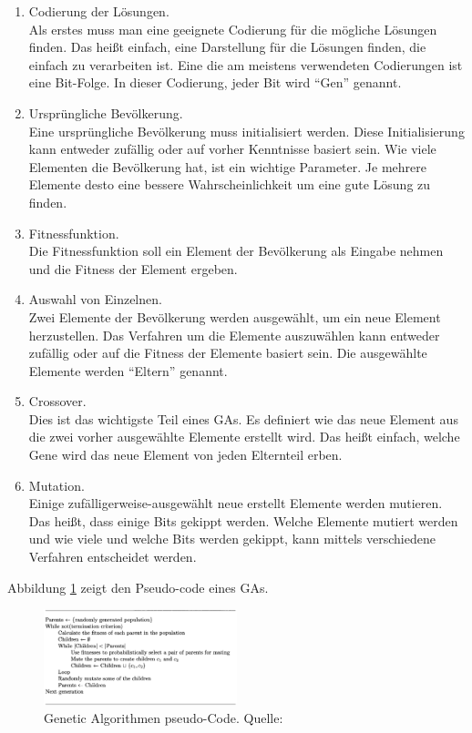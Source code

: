 \documentclass[twoside,twocolumn]{article}
\begin{document}
\begin{enumerate}
\item{Codierung der Lösungen.}\\
Als erstes muss man eine geeignete Codierung für die mögliche Lösungen finden. Das heißt einfach, eine Darstellung für die Lösungen finden, die einfach zu verarbeiten ist. Eine die am meistens verwendeten Codierungen ist eine Bit-Folge. In dieser Codierung, jeder Bit wird ``Gen'' genannt.
\item{Ursprüngliche Bevölkerung.}\\
Eine ursprüngliche Bevölkerung muss initialisiert werden. Diese Initialisierung kann entweder zufällig oder auf vorher Kenntnisse basiert sein. Wie viele Elementen die Bevölkerung hat, ist ein wichtige Parameter. Je mehrere Elemente desto eine bessere Wahrscheinlichkeit um eine gute Lösung zu finden.
\item{Fitnessfunktion.}\\
Die Fitnessfunktion soll ein Element der Bevölkerung als Eingabe nehmen und die Fitness der Element ergeben.
\item{Auswahl von Einzelnen.}\\
Zwei Elemente der Bevölkerung werden ausgewählt, um ein neue Element herzustellen. Das Verfahren um die Elemente auszuwählen kann entweder zufällig oder auf die Fitness der Elemente basiert sein. Die ausgewählte Elemente werden ``Eltern'' genannt.
\item{Crossover.}\\
Dies ist das wichtigste Teil eines GAs. Es definiert wie das neue Element aus die zwei vorher ausgewählte Elemente erstellt wird. Das heißt einfach, welche Gene wird das neue Element von jeden Elternteil erben.
\item{Mutation.}\\
Einige zufälligerweise-ausgewählt neue erstellt Elemente werden mutieren. Das heißt, dass einige Bits gekippt werden. Welche Elemente mutiert werden und wie viele und welche Bits werden gekippt, kann mittels verschiedene Verfahren entscheidet werden.
\end{enumerate}

Abbildung \ref{fig:ga_pseudo} zeigt den Pseudo-code eines GAs.

\begin{figure}[h]
\caption{ Genetic Algorithmen pseudo-Code. Quelle: \cite{wiley_evolutionary}}
\label{fig:ga_pseudo}
\centering
\includegraphics[width=0.5\textwidth]{images/ga_pseudo.png}
\end{figure}
\end{document}
